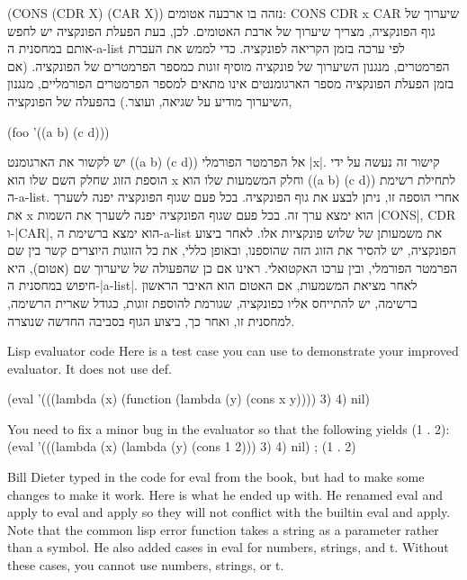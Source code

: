 (CONS (CDR X) (CAR X))
נזהה בו ארבעה אטומים:
CONS
CDR
x
CAR
שיערוך של גוף הפונקציה, מצריך שיערוך של ארבת האטומים. לכן, בעת הפעלת הפונקציה
יש לחפש אותם במחסנית ה-a-list לפי ערכה בזמן הקריאה לפונקציה. כדי לממש את העברת
הפרמטרים, מנגנון השיערוך של פונקציה מוסיף זוגות כמספר הפרמטרים של הפונקציה. (אם
בזמן הפעלת הפונקציה מספר הארגומנטים אינו מתאים למספר הפרמטרים הפורמליים, מנגנון
השיערוך מודיע על שגיאה, ועוצר.) בהפעלה של הפונקציה,
\begin{english}
  (foo '((a b) (c d)))
\end{english}
יש לקשור את הארגומנט ((a b) (c d)) אל הפרמטר הפורמלי \E|x|. קישור זה נעשה על
ידי הוספת הזוג שחלק השם שלו הוא x וחלק המשמעות שלו הוא ((a b) (c d)) לתחילת
רשימת
ה-a-list. אחרי הוספה זו, ניתן לבצע את גוף הפונקציה. בכל פעם שגוף הפונקציה יפנה
לשערך את x הוא ימצא ערך זה. בכל פעם שגוף הפונקציה יפנה לשערך את השמות \E|CONS|,
CDR ו-\E|CAR|, הוא ימצא ברשימת ה-a-list את משמעותן של שלוש פונקציות אלו. לאחר
ביצוע
הפונקציה, יש להסיר את הזוג הזה שהוספנו, ובאופן כללי, את כל הזוגות היוצרים קשר
בין שם הפרמטר הפורמלי, ובין ערכו האקטואלי. ראינו אם כן שהפעולה של שיערוך שם
(אטום), היא חיפוש במחסנית ה-\E|a-list|. לאחר מציאת המשמעות, אם האטום הוא האיבר
הראשון ברשימה, יש להתייחס אליו כפונקציה, שגורמת להוספת זוגות, כגודל שארית
הרשימה, למחסנית זו, ואחר כך, ביצוע הגוף בסביבה החדשה שנוצרה.

Lisp evaluator code Here is a test case you can use to demonstrate your
improved evaluator. It does not use def.

\begin{english}
  (eval '(((lambda (x) (function (lambda (y) (cons x y)))) 3) 4) nil)
\end{english}

You need to fix a minor bug in the evaluator so that the following yields (1 .
2): (eval '(((lambda (x) (lambda (y) (cons 1 2))) 3) 4) nil) ; (1 . 2)

Bill Dieter typed in the code for eval from the book, but had to make some
changes to make it work. Here is what he ended up with. He renamed eval and
apply to eval and apply so they will not conflict with the
builtin eval and apply. Note that the common lisp error function takes a
string as a parameter rather than a symbol. He also added cases in eval for
numbers, strings, and t. Without these cases, you cannot use numbers, strings,
or t.

